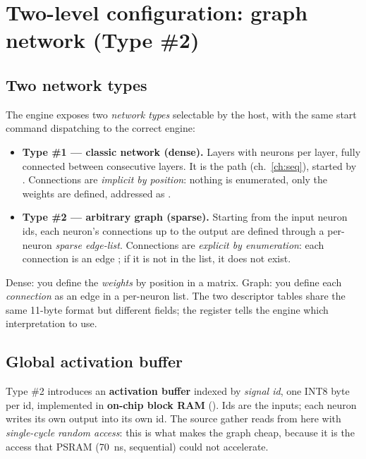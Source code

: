 \chapter[Graph network (Type \#2)]{Two-level configuration: graph network (Type \#2)}
\label{ch:grafo}

\section{Two network types}
The engine exposes two \emph{network types} selectable by the host, with the same start
command dispatching to the correct engine:

\begin{itemize}
\item \textbf{Type \#1 --- classic network (dense).} Layers with neurons per layer, fully
connected between consecutive layers. It is the  path
(ch.~\ref{ch:seq}), started by . Connections are \emph{implicit by
position}: nothing is enumerated, only the weights are defined, addressed as
.
\item \textbf{Type \#2 --- arbitrary graph (sparse).} Starting from the input neuron ids,
each neuron's connections up to the output are defined through a per-neuron \emph{sparse
edge-list}. Connections are \emph{explicit by enumeration}: each connection is an edge
; if it is not in the list, it does not exist.
\end{itemize}

\begin{fnnote}
Dense: you define the \emph{weights} by position in a matrix. Graph: you define each
\emph{connection} as an edge  in a per-neuron list. The two
descriptor tables share the same 11-byte format but different fields; the
 register tells the engine which interpretation to use.
\end{fnnote}

\section{Global activation buffer}
Type \#2 introduces an \textbf{activation buffer} indexed by \emph{signal id}, one INT8
byte per id, implemented in \textbf{on-chip  block RAM}
(). Ids  are the inputs; each neuron writes its
own output into its own id. The source gather reads from here with \emph{single-cycle
random access}: this is what makes the graph cheap, because it is the access that PSRAM
(70~ns, sequential) could not accelerate.

